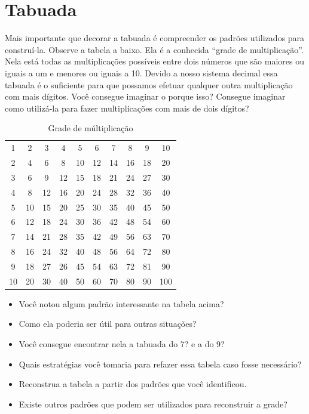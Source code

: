 \chapter{Tabuada}

Mais importante que decorar a tabuada é compreender os padrões utilizados para construí-la. Observe a tabela a baixo. Ela é a conhecida ``grade de multiplicação''. Nela está todas as multiplicações possíveis entre dois números que são maiores ou iguais a um e menores ou iguais a 10. Devido a nosso sistema decimal essa tabuada é o suficiente para que possamos efetuar qualquer outra multiplicação com mais dígitos. Você consegue imaginar o porque isso? Consegue imaginar como utilizá-la para fazer multiplicações com mais de dois dígitos?

\begin{table}[h]
    \centering
    \begin{tabular}{c|c|c|c|c|c|c|c|c|c}
        1  &  2 &  3 &  4 &  5 &  6 &  7 &  8 &  9 & 10\\
        2  &  4 &  6 &  8 & 10 & 12 & 14 & 16 & 18 & 20\\
        3  &  6 &  9 & 12 & 15 & 18 & 21 & 24 & 27 & 30\\
        4  &  8 & 12 & 16 & 20 & 24 & 28 & 32 & 36 & 40\\
        5  & 10 & 15 & 20 & 25 & 30 & 35 & 40 & 45 & 50\\
        6  & 12 & 18 & 24 & 30 & 36 & 42 & 48 & 54 & 60\\
        7  & 14 & 21 & 28 & 35 & 42 & 49 & 56 & 63 & 70\\
        8  & 16 & 24 & 32 & 40 & 48 & 56 & 64 & 72 & 80\\
        9  & 18 & 27 & 26 & 45 & 54 & 63 & 72 & 81 & 90\\
        10 & 20 & 30 & 40 & 50 & 60 & 70 & 80 & 90 & 100\\
    \end{tabular}
    \caption{Grade de múltiplicação}
    \label{tab:my_label}
\end{table}

\begin{itemize}
\item Você notou algum padrão interessante na tabela acima?
\item Como ela poderia ser útil para outras situações?
\item Você consegue encontrar nela a tabuada do 7? e a do 9?
\item Quais estratégias você tomaria para refazer essa tabela caso fosse necessário?
\item Reconstrua a tabela a partir dos padrões que você identificou.
\item Existe outros padrões que podem ser utilizados para reconstruir a grade?
\end{itemize}

